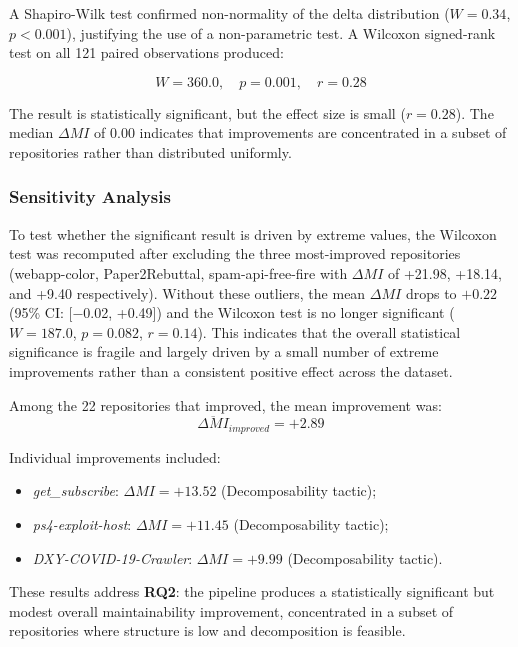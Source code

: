 A Shapiro-Wilk test confirmed non-normality of the delta distribution ($W = 0.34$, $p < 0.001$), justifying the use of a non-parametric test. A Wilcoxon signed-rank test on all 121 paired observations produced:

\begin{equation}
W = 360.0,\quad p = 0.001,\quad r = 0.28
\end{equation}

The result is statistically significant, but the effect size is small ($r = 0.28$). The median $\Delta MI$ of 0.00 indicates that improvements are concentrated in a subset of repositories rather than distributed uniformly.

\subsubsection{Sensitivity Analysis}

To test whether the significant result is driven by extreme values, the Wilcoxon test was recomputed after excluding the three most-improved repositories (webapp-color, Paper2Rebuttal, spam-api-free-fire with $\Delta MI$ of +21.98, +18.14, and +9.40 respectively). Without these outliers, the mean $\Delta MI$ drops to $+0.22$ (95\% CI: [$-$0.02, +0.49]) and the Wilcoxon test is no longer significant ($W = 187.0$, $p = 0.082$, $r = 0.14$). This indicates that the overall statistical significance is fragile and largely driven by a small number of extreme improvements rather than a consistent positive effect across the dataset.

Among the 22 repositories that improved, the mean improvement was:
\begin{equation}
\overline{\Delta MI}_{improved} = +2.89
\end{equation}

Individual improvements included:
\begin{itemize}
    \item \textit{get\_subscribe}: $\Delta MI = +13.52$ (Decomposability tactic);
    \item \textit{ps4-exploit-host}: $\Delta MI = +11.45$ (Decomposability tactic);
    \item \textit{DXY-COVID-19-Crawler}: $\Delta MI = +9.99$ (Decomposability tactic).
\end{itemize}

These results address \textbf{RQ2}: the pipeline produces a statistically significant but modest overall maintainability improvement, concentrated in a subset of repositories where structure is low and decomposition is feasible.

